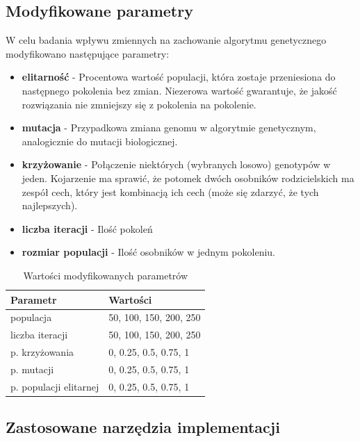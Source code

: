 \documentclass{article}
\begin{document}
\subsection{Modyfikowane parametry}

W celu badania wpływu zmiennych na zachowanie algorytmu genetycznego modyfikowano następujące parametry:

\begin{itemize}
\item \textbf{elitarność} - Procentowa wartość populacji, która zostaje przeniesiona do następnego pokolenia bez zmian. Niezerowa wartość gwarantuje, że jakość rozwiązania nie zmniejszy się z pokolenia na pokolenie.

\item \textbf{mutacja} - Przypadkowa zmiana genomu w algorytmie genetycznym, analogicznie do mutacji biologicznej.

\item \textbf{krzyżowanie} -  Połączenie niektórych (wybranych losowo) genotypów w jeden. Kojarzenie ma sprawić, że potomek dwóch osobników rodzicielskich ma zespół cech, który jest kombinacją ich cech (może się zdarzyć, że tych najlepszych).

\item \textbf{liczba iteracji} - Ilość pokoleń  
\item \textbf{rozmiar populacji} - Ilość osobników w jednym pokoleniu.
\end{itemize}


\begin{table}[!htbp]
\centering
\caption{Wartości modyfikowanych parametrów}
\label{my-label}
\begin{tabular}{|l|l|}
\hline
\rowcolor[HTML]{C0C0C0} 
\textbf{Parametr}      & \textbf{Wartości}      \\ \hline
populacja              & 50, 100, 150, 200, 250 \\ \hline
liczba iteracji        & 50, 100, 150, 200, 250 \\ \hline
p. krzyżowania         & 0, 0.25, 0.5, 0.75, 1  \\ \hline
p. mutacji             & 0, 0.25, 0.5, 0.75, 1  \\ \hline
p. populacji elitarnej & 0, 0.25, 0.5, 0.75, 1  \\ \hline
\end{tabular}
\end{table}


\subsection{Zastosowane narzędzia implementacji}
\end{document}
